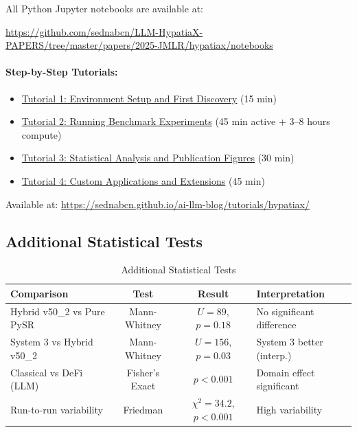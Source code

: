 \documentclass[twoside,11pt]{article}
\begin{document}
All Python Jupyter notebooks are available at:
\begin{center}
{\footnotesize\url{https://github.com/sednabcn/LLM-HypatiaX-PAPERS/tree/master/papers/2025-JMLR/hypatiax/notebooks}}
\end{center}


\paragraph{Step-by-Step Tutorials:}
\begin{itemize}
\item \href{https://sednabcn.github.io/ai-llm-blog/tutorials/hypatiax/setup/}{Tutorial 1: Environment Setup and First Discovery} (15 min)
\item \href{https://sednabcn.github.io/ai-llm-blog/tutorials/hypatiax/experiments/}{Tutorial 2: Running Benchmark Experiments} (45 min active + 3--8 hours compute)
\item \href{https://sednabcn.github.io/ai-llm-blog/tutorials/hypatiax/analysis/}{Tutorial 3: Statistical Analysis and Publication Figures} (30 min)
\item \href{https://sednabcn.github.io/ai-llm-blog/tutorials/hypatiax/extensions/}{Tutorial 4: Custom Applications and Extensions} (45 min)
\end{itemize}
Available at: \url{https://sednabcn.github.io/ai-llm-blog/tutorials/hypatiax/}


\subsection{Additional Statistical Tests}

\begin{table}[H]
\centering
\caption{Additional Statistical Tests}
\label{tab:additional_stats}
{\small\begin{tabular}{@{}lccl@{}}
\toprule
\textbf{Comparison} & \textbf{Test} & \textbf{Result} & \textbf{Interpretation} \\
\midrule
Hybrid v50\_2 vs Pure PySR & Mann-Whitney & $U = 89$, $p = 0.18$ & No significant difference \\
System 3 vs Hybrid v50\_2 & Mann-Whitney & $U = 156$, $p = 0.03$ & System 3 better (interp.) \\
Classical vs DeFi (LLM) & Fisher's Exact & $p < 0.001$ & Domain effect significant \\
Run-to-run variability & Friedman & $\chi^2 = 34.2$, $p < 0.001$ & High variability \\
\bottomrule
\end{tabular}}
\end{table}
\end{document}
